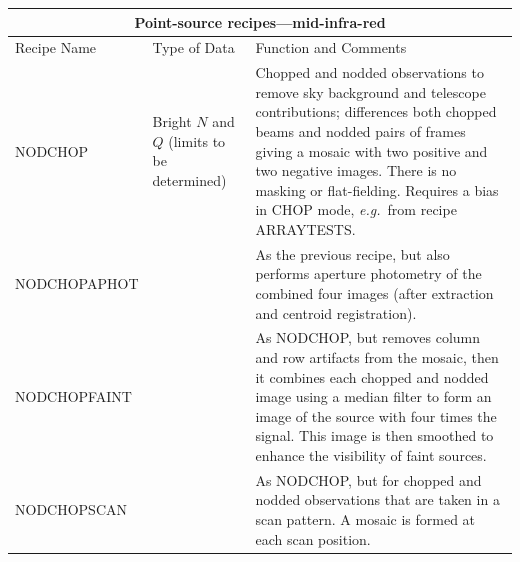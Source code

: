 \documentclass[twoside,11pt]{article}
\newcommand{\htmlref}[2]{#1}
\renewcommand{\_}{\texttt{\symbol{95}}}
\begin{document}
\begin{center}
\begin{tabular}{|l|p{25mm}|p{82mm}|}
\multicolumn{3}{c}{\large{\bf Point-source recipes---mid-infra-red}} \vspace*{1ex} \\
\hline
Recipe Name & Type of Data & Function and Comments \\ \hline
\htmlref{NOD\_CHOP}{NOD\_CHOP} &
   Bright $N$ and $Q$ (limits to be determined) &
   Chopped and nodded observations to remove sky background and telescope
   contributions; differences both chopped beams and nodded pairs of frames
   giving a mosaic with two positive and two negative images.  There
   is no masking or flat-fielding.  Requires a bias in CHOP mode,
   {\em e.g.}\ from recipe ARRAY\_TESTS.  \\ \hline
\htmlref{NOD\_CHOP\_APHOT}{NOD\_CHOP\_APHOT} & &
   As the previous recipe, but also performs aperture photometry of the
   combined four images (after extraction and centroid registration). \\ \hline
\htmlref{NOD\_CHOP\_FAINT}{NOD\_CHOP\_FAINT} & &
   As NOD\_CHOP, but removes column and row artifacts from the mosaic, then
   it combines each chopped and nodded image using a median filter to form an
   image of the source with four times the signal.  This image is then smoothed
   to enhance the visibility of faint sources. \\ \hline
\htmlref{NOD\_CHOP\_SCAN}{NOD\_CHOP\_SCAN} & &
   As NOD\_CHOP, but for chopped and nodded observations that are taken in a
   scan pattern.  A mosaic is formed at each scan position. \\ \hline
\end{tabular}
\end{center}
\medskip
\end{document}
